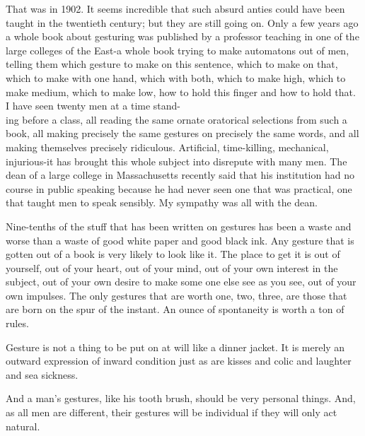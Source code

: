 \documentclass[10pt]{article}
\begin{document}
That was in 1902. It seems incredible that such absurd anties could have been taught in the twentieth century; but they are still going on. Only a few years ago a whole book about gesturing was published by a professor teaching in one of the large colleges of the East-a whole book trying to make automatons out of men, telling them which gesture to make on this sentence, which to make on that, which to make with one hand, which with both, which to make high, which to make medium, which to make low, how to hold this finger and how to hold that. I have seen twenty men at a time stand-\\
ing before a class, all reading the same ornate oratorical selections from such a book, all making precisely the same gestures on precisely the same words, and all making themselves precisely ridiculous. Artificial, time-killing, mechanical, injurious-it has brought this whole subject into disrepute with many men. The dean of a large college in Massachusetts recently said that his institution had no course in public speaking because he had never seen one that was practical, one that taught men to speak sensibly. My sympathy was all with the dean.

Nine-tenths of the stuff that has been written on gestures has been a waste and worse than a waste of good white paper and good black ink. Any gesture that is gotten out of a book is very likely to look like it. The place to get it is out of yourself, out of your heart, out of your mind, out of your own interest in the subject, out of your own desire to make some one else see as you see, out of your own impulses. The only gestures that are worth one, two, three, are those that are born on the spur of the instant. An ounce of spontaneity is worth a ton of rules.

Gesture is not a thing to be put on at will like a dinner jacket. It is merely an outward expression of inward condition just as are kisses and colic and laughter and sea sickness.

And a man's gestures, like his tooth brush, should be very personal things. And, as all men are different, their gestures will be individual if they will only act natural.
\end{document}
